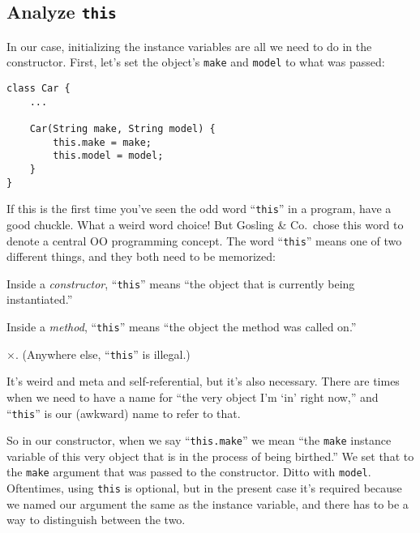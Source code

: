 \subsection{Analyze \texttt{this}}

In our case, initializing the instance variables are all we need to do in the
constructor. First, let's set the object's \texttt{make} and \texttt{model} to
what was passed:

\begin{Verbatim}[samepage=true,fontsize=\footnotesize,frame=single]
class Car {
    ...

    Car(String make, String model) {
        this.make = make;
        this.model = model;
    }
}
\end{Verbatim}
\normalsize

If this is the first time you've seen the odd word ``\texttt{this}'' in a
program, have a good chuckle. What a weird word choice! But Gosling \&
Co.~chose this word to denote a central OO programming concept. The word
``\texttt{this}'' means one of two different things, and they both need to be
memorized:

\begin{samepage}
\begin{shaded}
\begin{compactenum}
\item Inside a \textit{constructor}, ``\texttt{this}'' means ``the object that is
currently being instantiated.''
\item Inside a \textit{method}, ``\texttt{this}'' means ``the object the
method was called on.''
\item[$\times$.] (Anywhere else, ``\texttt{this}'' is illegal.)
\normalsize
\end{compactenum}
\end{shaded}
\end{samepage}

It's weird and meta and self-referential, but it's also necessary. There are
times when we need to have a name for ``the very object I'm `in' right now,''
and ``\texttt{this}'' is our (awkward) name to refer to that.

So in our constructor, when we say ``\texttt{this.make}'' we mean ``the
\texttt{make} instance variable of this very object that is in the process of
being birthed.'' We set that to the \texttt{make} argument that was passed to
the constructor. Ditto with \texttt{model}. Oftentimes, using \texttt{this} is
optional, but in the present case it's required because we named our argument
the same as the instance variable, and there has to be a way to distinguish
between the two.

